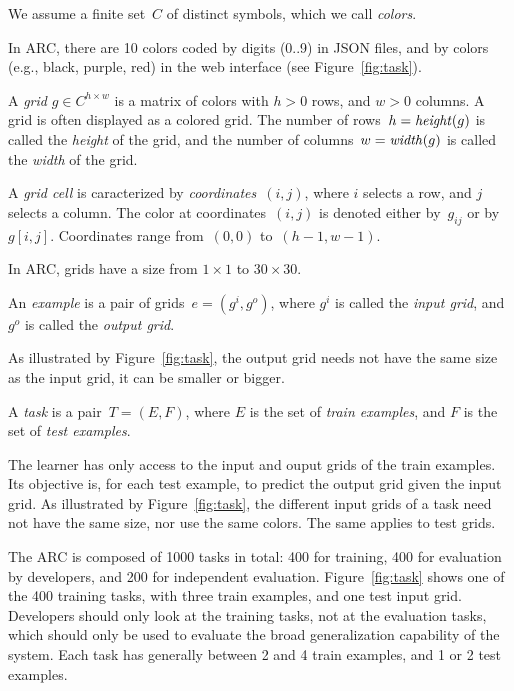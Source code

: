 \documentclass[a4paper]{llncs}
\begin{document}
\begin{definition}[colors]
  We assume a finite set~$C$ of distinct symbols, which we call {\em colors}.
\end{definition}

In ARC, there are 10 colors coded by digits (0..9) in JSON files, and
by colors (e.g., black, purple, red) in the web interface (see
Figure~\ref{fig:task}).

\begin{definition}[grid]
  A {\em grid} $g \in C^{h \times w}$ is a matrix of colors with $h>0$
  rows, and $w>0$ columns. A grid is often displayed as a colored
  grid. The number of rows~$h = {\it height}(g)$ is called the {\em
    height} of the grid, and the number of
  columns~$w = {\it width}(g)$ is called the {\em width} of the grid.
  
  A {\em grid cell} is caracterized by {\em coordinates}~$(i,j)$,
  where $i$ selects a row, and $j$ selects a column. The color at
  coordinates~$(i,j)$ is denoted either by~$g_{ij}$ or by~$g[i,j]$.
  Coordinates range from~$(0,0)$ to~$(h-1,w-1)$.
\end{definition}

In ARC, grids have a size from $1 \times 1$ to $30 \times 30$.

\begin{definition}[example] 
  An {\em example} is a pair of grids~$e = (g^i,g^o)$, where $g^i$ is called
  the {\em input grid}, and $g^o$ is called the {\em output grid}.
\end{definition}

As illustrated by Figure~\ref{fig:task}, the output grid needs not
have the same size as the input grid, it can be smaller or bigger.

\begin{definition}[task]
  A {\em task} is a pair~$T = (E,F)$, where $E$ is the set of {\em
    train examples}, and $F$ is the set of {\em test examples}.
\end{definition}

The learner has only access to the input and ouput grids of the
train examples. Its objective is, for each test example, to predict
the output grid given the input grid.
%
As illustrated by Figure~\ref{fig:task}, the different input grids of
a task need not have the same size, nor use the same colors. The same
applies to test grids.

The ARC is composed of 1000 tasks in total: 400 for training, 400 for
evaluation by developers, and 200 for independent
evaluation. Figure~\ref{fig:task} shows one of the 400 training tasks,
with three train examples, and one test input grid. Developers should
only look at the training tasks, not at the evaluation tasks, which
should only be used to evaluate the broad generalization capability of
the system.
%
Each task has generally between 2 and 4 train examples, and 1 or 2
test examples.
\end{document}
